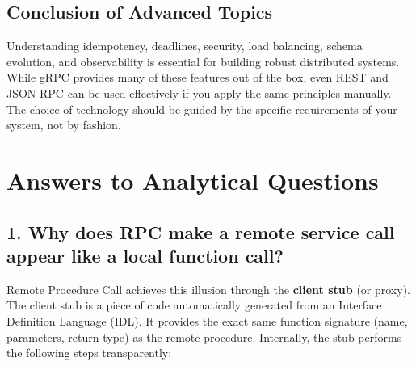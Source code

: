 \documentclass[10pt,a4paper]{article}
\begin{document}
\subsection{Conclusion of Advanced Topics}
Understanding idempotency, deadlines, security, load balancing, schema evolution, and observability is essential for building robust distributed systems. While gRPC provides many of these features out of the box, even REST and JSON-RPC can be used effectively if you apply the same principles manually. The choice of technology should be guided by the specific requirements of your system, not by fashion.





















































\section{Answers to Analytical Questions}

\subsection{1. Why does RPC make a remote service call appear like a local function call?}

Remote Procedure Call achieves this illusion through the \textbf{client stub} (or proxy). The client stub is a piece of code automatically generated from an Interface Definition Language (IDL). It provides the exact same function signature (name, parameters, return type) as the remote procedure. Internally, the stub performs the following steps transparently:
\end{document}
